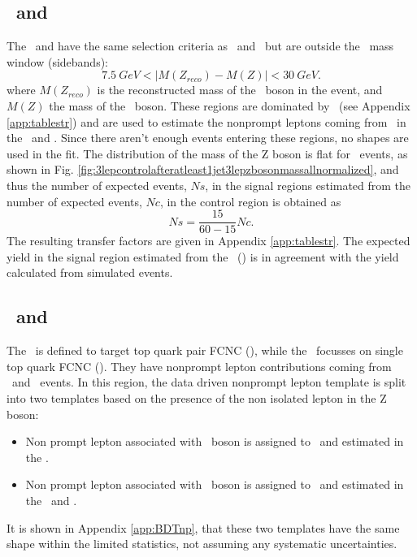 \subsection{\TTCR\ and \STCR}
The \TTCR\ and \STCR have the same selection criteria as \TTSR\ and \STSR\, but are outside the \PZ\ mass window (sidebands): 
\begin{equation}
7.5 \: GeV < |M(Z_{reco}) - M(Z)| < 30 \:GeV. 
\end{equation}
where $M(Z_{reco})$ is the reconstructed mass of the \PZ\ boson in the event, and $M(Z)$ the mass of the \PZ\ boson.
These regions are dominated by \ttbar\ (see Appendix \ref{app:tablestr}) and are used to estimate the nonprompt  leptons coming from \ttbar\ in the \STSR\ and \TTSR. Since there aren't enough events entering these regions, no shapes are used in the fit. The distribution of the mass of the Z boson is flat for \ttbar\ events, as shown in Fig. \ref{fig:3lepcontrolafteratleast1jet3lepzbosonmassallnormalized},  and thus the number of expected events, $Ns$, in the signal regions estimated from the number of expected events, $Nc$, in the control region is obtained as
\begin{equation}
Ns = \frac{15}{60-15} Nc.
\end{equation}
The resulting transfer factors are given in Appendix \ref{app:tablestr}. The expected yield in the signal region estimated from the \TTCR\ (\STCR) is in agreement with the yield calculated from simulated events. 



\subsection{\TTSR\ and \STSR}
The \TTSR\ is defined to target top quark pair FCNC (\tZq), while the \STSR\ focusses on single top quark FCNC (\tZ). They have nonprompt  lepton contributions coming from \DY\ and \ttbar\ events. In this region, the data driven nonprompt  lepton template is split into two templates based on the presence of the non isolated lepton in the Z boson: 
\begin{itemize}
	\item Non prompt lepton associated with \PW\ boson is assigned to \DY\ and estimated in the \WZCR.
	\item Non prompt lepton associated with \PZ\ boson is assigned to \ttbar\ and estimated in the \TTCR\ and \STCR.
\end{itemize}
It is shown in Appendix \ref{app:BDTnp}, that these two templates have the same shape within the limited statistics, not assuming any systematic uncertainties. 

